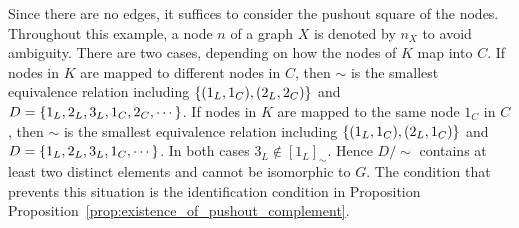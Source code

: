     \begin{center}
        \end{center}      
  
Since there are no edges, it suffices to consider the pushout square of the nodes. Throughout this example, a node \(n\) of a graph \(X\) is denoted by \(n_X\) to avoid ambiguity. There are two cases, depending on how the nodes of \(K\) map into \(C\). 
If nodes in $K$ are mapped to different nodes in $C$, then
        $\sim$ is the smallest equivalence relation including $\{(1_L,1_C),(2_L,2_C)\}$ and $D = \{1_L,2_L,3_L,1_C,2_C,\cdots\}$.
If nodes in $K$ are mapped to the same node $1_C$ in $C$, then
        $\sim$ is the smallest equivalence relation including $\{(1_L,1_C),(2_L,1_C)\}$ and $D = \{1_L,2_L,3_L,1_C,\cdots\}$.
In both cases \(3_L\notin[1_L]_\sim\). Hence \(D/\!\sim\) contains at least two distinct elements and cannot be isomorphic to \(G\). The condition that prevents this situation is the identification condition in Proposition Proposition~\ref{prop:existence_of_pushout_complement}.

